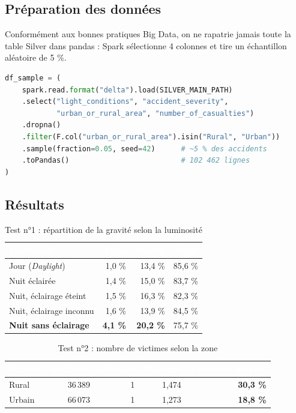 \documentclass[11pt,a4paper]{report}
\newcommand{\hd}[1]{\textcolor{white}{\bfseries #1}}
\newcommand{\headrow}{\rowcolor{primary}}
\begin{document}
\subsection{Préparation des données}

Conformément aux bonnes pratiques Big Data, on ne rapatrie jamais toute la table Silver dans pandas : Spark sélectionne 4 colonnes et tire un échantillon aléatoire de 5 \%.

\begin{lstlisting}[language=Python]
df_sample = (
    spark.read.format("delta").load(SILVER_MAIN_PATH)
    .select("light_conditions", "accident_severity",
            "urban_or_rural_area", "number_of_casualties")
    .dropna()
    .filter(F.col("urban_or_rural_area").isin("Rural", "Urban"))
    .sample(fraction=0.05, seed=42)      # ~5 % des accidents
    .toPandas()                          # 102 462 lignes
)
\end{lstlisting}

\subsection{Résultats}

\begin{table}[H]
\centering
{}
\begin{tabular}{@{}l r r r@{}}
\toprule
\headrow \hd{Luminosité} & \hd{Fatal} & \hd{Serious} & \hd{Slight} \\
\midrule
Jour (\emph{Daylight}) & 1,0 \% & 13,4 \% & 85,6 \% \\
Nuit éclairée & 1,4 \% & 15,0 \% & 83,7 \% \\
Nuit, éclairage éteint & 1,5 \% & 16,3 \% & 82,3 \% \\
Nuit, éclairage inconnu & 1,6 \% & 13,9 \% & 84,5 \% \\
\textbf{Nuit sans éclairage} & \textbf{4,1 \%} & \textbf{20,2 \%} & 75,7 \% \\
\bottomrule
\end{tabular}
\caption{Test n°1 : répartition de la gravité selon la luminosité}
\end{table}

\begin{table}[H]
\centering
{}
\begin{tabular}{@{}l r r r r@{}}
\toprule
\headrow \hd{Groupe} & \hd{Accidents} & \hd{Médiane} & \hd{Moyenne} & \hd{2 victimes ou plus} \\
\midrule
Rural & 36\,389 & 1 & 1,474 & \textbf{30,3 \%} \\
Urbain & 66\,073 & 1 & 1,273 & \textbf{18,8 \%} \\
\bottomrule
\end{tabular}
\caption{Test n°2 : nombre de victimes selon la zone}
\end{table}
\end{document}
